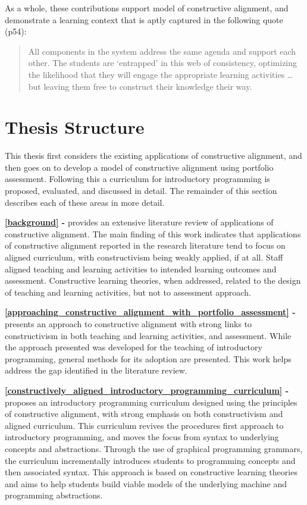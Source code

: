 As a whole, these contributions support \citet{Biggs:1996c} model of constructive alignment, and demonstrate a learning context that is aptly captured in the following quote \citep{Biggs:2007} (p54):

\begin{quote}
	All components in the system address the same agenda and support each other. The students are `entrapped' in this web of consistency, optimizing the likelihood that they will engage the appropriate learning activities \ldots but leaving them free to construct their knowledge their way.
\end{quote}



\section{Thesis Structure} %
\label{sec:thesis_structure}

This thesis first considers the existing applications of constructive alignment, and then goes on to develop a model of constructive alignment using portfolio assessment. Following this a curriculum for introductory programming is proposed, evaluated, and discussed in detail. The remainder of this section describes each of these areas in more detail. 

\textbf{\cref{background} - } provides an extensive literature review of applications of constructive alignment. The main finding of this work indicates that applications of constructive alignment reported in the research literature tend to focus on aligned curriculum, with constructivism being weakly applied, if at all. Staff aligned teaching and learning activities to intended learning outcomes and assessment. Constructive learning theories, when addressed, related to the design of teaching and learning activities, but not to assessment approach.

\textbf{\cref{approaching_constructive_alignment_with_portfolio_assessment} - } presents an approach to constructive alignment with strong links to constructivism in both teaching and learning activities, and assessment. While the approach presented was developed for the teaching of introductory programming, general methods for its adoption are presented. This work helps address the gap identified in the literature review.

\textbf{\cref{constructively_aligned_introductory_programming_curriculum} - } proposes an introductory programming curriculum designed using the principles of constructive alignment, with strong emphasis on both constructivism and aligned curriculum. This curriculum revives the procedures first approach to introductory programming, and moves the focus from syntax to underlying concepts and abstractions. Through the use of graphical programming grammars, the curriculum incrementally introduces students to programming concepts and then associated syntax. This approach is based on constructive learning theories and aims to help students build viable models of the underlying machine and programming abstractions. 
 
